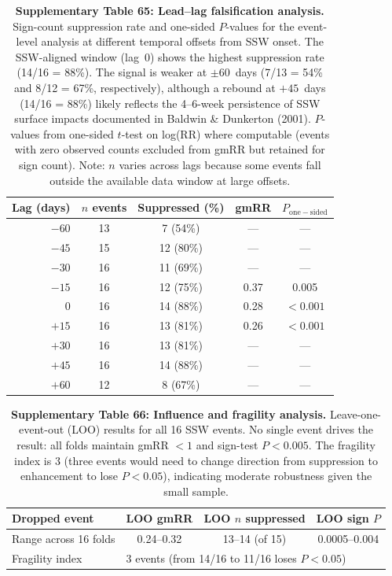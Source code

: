 \documentclass[11pt,letterpaper]{article}
\begin{document}
\begin{table}[!ht]
\centering
\caption{\textbf{Supplementary Table 65: Lead--lag falsification analysis.}
Sign-count suppression rate and one-sided $P$-values for the event-level analysis at different temporal offsets from SSW onset. The SSW-aligned window (lag~0) shows the highest suppression rate (14/16 = 88\%). The signal is weaker at $\pm 60$~days (7/13 = 54\% and 8/12 = 67\%, respectively), although a rebound at $+45$~days (14/16 = 88\%) likely reflects the 4--6-week persistence of SSW surface impacts documented in Baldwin \& Dunkerton (2001). $P$-values from one-sided $t$-test on log(RR) where computable (events with zero observed counts excluded from gmRR but retained for sign count). Note: $n$ varies across lags because some events fall outside the available data window at large offsets.}
\label{tab:lead_lag}
\small
\begin{tabular}{rcccc}
\toprule
Lag (days) & $n$ events & Suppressed (\%) & gmRR & $P_{\mathrm{one-sided}}$ \\
\midrule
$-60$ & 13 & 7 (54\%) & --- & --- \\
$-45$ & 15 & 12 (80\%) & --- & --- \\
$-30$ & 16 & 11 (69\%) & --- & --- \\
$-15$ & 16 & 12 (75\%) & 0.37 & 0.005 \\
$0$ & 16 & 14 (88\%) & 0.28 & $<0.001$ \\
$+15$ & 16 & 13 (81\%) & 0.26 & $<0.001$ \\
$+30$ & 16 & 13 (81\%) & --- & --- \\
$+45$ & 16 & 14 (88\%) & --- & --- \\
$+60$ & 12 & 8 (67\%) & --- & --- \\
\bottomrule
\end{tabular}
\end{table}

\begin{table}[!ht]
\centering
\caption{\textbf{Supplementary Table 66: Influence and fragility analysis.}
Leave-one-event-out (LOO) results for all 16 SSW events. No single event drives the result: all folds maintain gmRR $< 1$ and sign-test $P < 0.005$. The fragility index is 3 (three events would need to change direction from suppression to enhancement to lose $P < 0.05$), indicating moderate robustness given the small sample.}
\label{tab:fragility}
\small
\begin{tabular}{p{2.5cm}ccc}
\toprule
Dropped event & LOO gmRR & LOO $n$ suppressed & LOO sign $P$ \\
\midrule
Range across 16 folds & 0.24--0.32 & 13--14 (of 15) & 0.0005--0.004 \\
\midrule
Fragility index & \multicolumn{3}{l}{3 events (from 14/16 to 11/16 loses $P < 0.05$)} \\
\bottomrule
\end{tabular}
\end{table}
\end{document}
